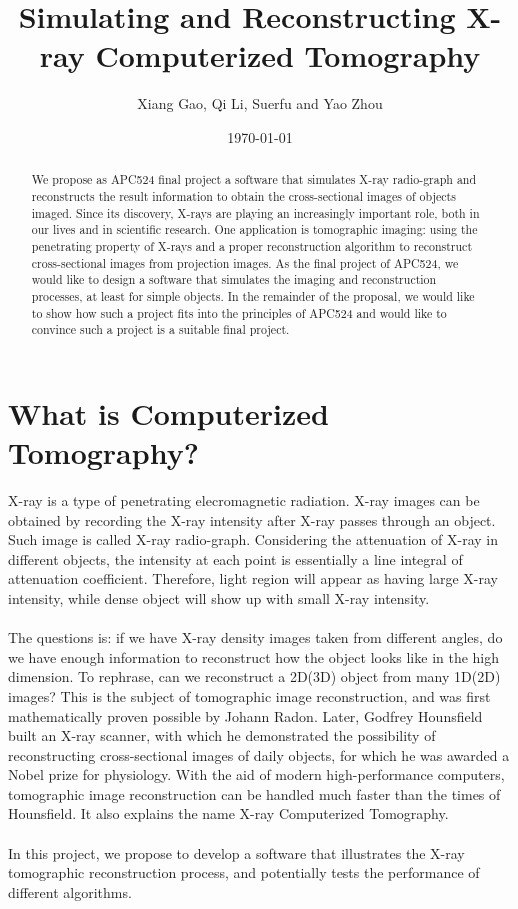 \documentclass[11]{article}
\title{Simulating and Reconstructing X-ray Computerized Tomography}
\author{Xiang Gao, Qi Li, Suerfu and Yao Zhou}
\date{\today}
\begin{document}
	\maketitle
	
\begin{abstract}
	We propose as APC524 final project a software that simulates X-ray radio-graph and reconstructs the result information to obtain the cross-sectional images of objects imaged. Since its discovery, X-rays are playing an increasingly important role, both in our lives and in scientific research. One application is tomographic imaging: using the penetrating property of X-rays and a proper reconstruction algorithm to reconstruct cross-sectional images from projection images. As the final project of APC524, we would like to design a software that simulates the imaging and reconstruction processes, at least for simple objects. In the remainder of the proposal, we would like to show how such a project fits into the principles of APC524 and would like to convince such a project is a suitable final project.
\end{abstract}

\section{What is Computerized Tomography?}
	X-ray is a type of penetrating elecromagnetic radiation. X-ray images can be obtained by recording the X-ray intensity after X-ray passes through an object. Such image is called X-ray radio-graph. Considering the attenuation of X-ray in different objects, the intensity at each point is essentially a line integral of attenuation coefficient. Therefore, light region will appear as having large X-ray intensity, while dense object will show up with small X-ray intensity.\\ \\
	The questions is: if we have X-ray density images taken from different angles, do we have enough information to reconstruct how the object looks like in the high dimension. To rephrase, can we reconstruct a 2D(3D) object from many 1D(2D) images? This is the subject of tomographic image reconstruction, and was first mathematically proven possible by Johann Radon. Later, Godfrey Hounsfield built an X-ray scanner, with which he demonstrated the possibility of reconstructing cross-sectional images of daily objects, for which he was awarded a Nobel prize for physiology. With the aid of modern high-performance computers, tomographic image reconstruction can be handled much faster than the times of Hounsfield. It also explains the name X-ray Computerized Tomography.
\\ \\
	In this project, we propose to develop a software that illustrates the X-ray tomographic reconstruction process, and potentially tests the performance of different algorithms.  
\end{document}
